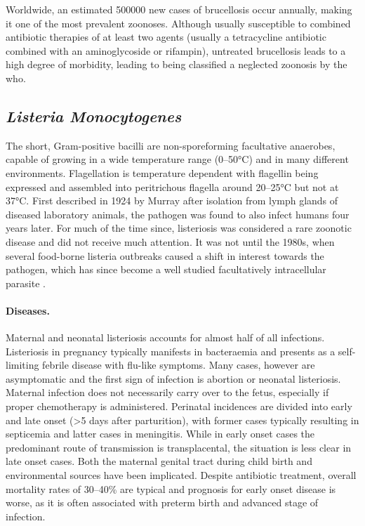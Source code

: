 Worldwide, an estimated 500000 new cases of brucellosis occur annually, making it one of the most prevalent zoonoses. Although usually susceptible to combined antibiotic therapies of at least two agents (usually a tetracycline antibiotic combined with an aminoglycoside or rifampin), untreated brucellosis leads to a high degree of morbidity, leading to being classified a neglected zoonosis by the \gls{who}.

\subsection{\textit{Listeria Monocytogenes}}

The short, Gram-positive bacilli are non-sporeforming facultative anaerobes, capable of growing in a wide temperature range (0--50\si{\degree}C) and in many different environments. Flagellation is temperature dependent with flagellin being expressed and assembled into peritrichous flagella around 20--25\si{\degree}C but not at 37\si{\degree}C. First described in 1924 by Murray after isolation from lymph glands of diseased laboratory animals, the pathogen was found to also infect humans four years later. For much of the time since, listeriosis was considered a rare zoonotic disease and did not receive much attention. It was not until the 1980s, when several food-borne listeria outbreaks caused a shift in interest towards the pathogen, which has since become a well studied facultatively intracellular parasite \citep{Farber1991}.

\paragraph{Diseases.}
Maternal and neonatal listeriosis accounts for almost half of all infections. Listeriosis in pregnancy typically manifests in bacteraemia and presents as a self-limiting febrile disease with flu-like symptoms. Many cases, however are asymptomatic and the first sign of infection is abortion or neonatal listeriosis. Maternal infection does not necessarily carry over to the fetus, especially if proper chemotherapy is administered. Perinatal incidences are divided into early and late onset (\textgreater 5 days after parturition), with former cases typically resulting in septicemia and latter cases in meningitis. While in early onset cases the predominant route of transmission is transplacental, the situation is less clear in late onset cases. Both the maternal genital tract during child birth and environmental sources have been implicated. Despite antibiotic treatment, overall mortality rates of 30--40\% are typical and prognosis for early onset disease is worse, as it is often associated with preterm birth and advanced stage of infection. 

